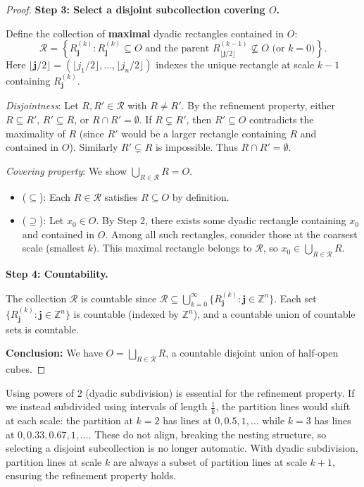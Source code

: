 \documentclass[11pt]{report}
\begin{document}
\begin{proof}
\textbf{Step 3: Select a disjoint subcollection covering $O$.}

Define the collection of \textbf{maximal} dyadic rectangles contained in $O$:
\[
\mathcal{R} = \left\{ R_{\mathbf{j}}^{(k)} : R_{\mathbf{j}}^{(k)} \subseteq O \text{ and the parent } R_{\lfloor \mathbf{j}/2 \rfloor}^{(k-1)} \not\subseteq O \text{ (or } k = 0) \right\}.
\]
Here $\lfloor \mathbf{j}/2 \rfloor = (\lfloor j_1/2 \rfloor, \ldots, \lfloor j_n/2 \rfloor)$ indexes the unique rectangle at scale $k-1$ containing $R_{\mathbf{j}}^{(k)}$.

\textit{Disjointness}: Let $R, R' \in \mathcal{R}$ with $R \neq R'$. By the refinement property, either $R \subseteq R'$, $R' \subseteq R$, or $R \cap R' = \emptyset$. If $R \subsetneq R'$, then $R' \subseteq O$ contradicts the maximality of $R$ (since $R'$ would be a larger rectangle containing $R$ and contained in $O$). Similarly $R' \subsetneq R$ is impossible. Thus $R \cap R' = \emptyset$.

\textit{Covering property}: We show $\bigcup_{R \in \mathcal{R}} R = O$.
\begin{itemize}
    \item ($\subseteq$): Each $R \in \mathcal{R}$ satisfies $R \subseteq O$ by definition.
    \item ($\supseteq$): Let $x_0 \in O$. By Step 2, there exists some dyadic rectangle containing $x_0$ and contained in $O$. Among all such rectangles, consider those at the coarsest scale (smallest $k$). This maximal rectangle belongs to $\mathcal{R}$, so $x_0 \in \bigcup_{R \in \mathcal{R}} R$.
\end{itemize}

\textbf{Step 4: Countability.}

The collection $\mathcal{R}$ is countable since $\mathcal{R} \subseteq \bigcup_{k=0}^{\infty} \{R_{\mathbf{j}}^{(k)} : \mathbf{j} \in \mathbb{Z}^n\}$. Each set $\{R_{\mathbf{j}}^{(k)} : \mathbf{j} \in \mathbb{Z}^n\}$ is countable (indexed by $\mathbb{Z}^n$), and a countable union of countable sets is countable.

\textbf{Conclusion:} We have $O = \bigsqcup_{R \in \mathcal{R}} R$, a countable disjoint union of half-open cubes.
\end{proof}

\begin{rembox}
Using powers of $2$ (dyadic subdivision) is essential for the refinement property. If we instead subdivided using intervals of length $\frac{1}{k}$, the partition lines would shift at each scale: the partition at $k=2$ has lines at $0, 0.5, 1, \ldots$ while $k=3$ has lines at $0, 0.33, 0.67, 1, \ldots$. These do not align, breaking the nesting structure, so selecting a disjoint subcollection is no longer automatic. With dyadic subdivision, partition lines at scale $k$ are always a subset of partition lines at scale $k+1$, ensuring the refinement property holds.
\end{rembox}
\end{document}
